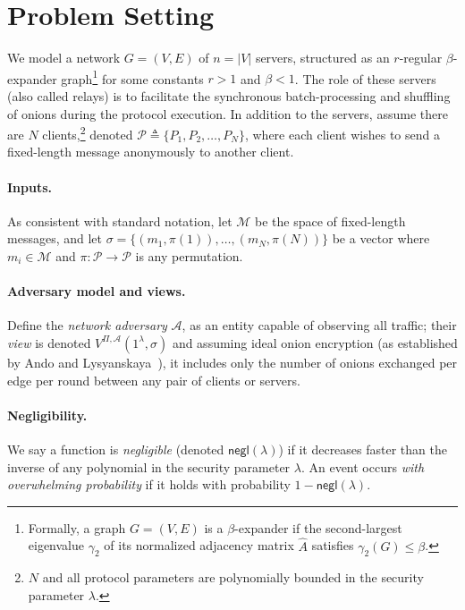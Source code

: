 \section{Problem Setting}

We model a network $G = (V, E)$ of  $n = |V|$ servers, structured as an $r$-regular $\beta$-expander graph\footnote{Formally, a graph $G = (V, E)$ is a $\beta$-expander if the second-largest eigenvalue $\gamma_2$ of its normalized adjacency matrix $\hat{A}$ satisfies $\gamma_2(G) \leq \beta$.} for some constants $r > 1$ and $\beta < 1$. The role of these servers (also called relays) is to facilitate the synchronous batch-processing and shuffling of onions during the protocol execution. In addition to the servers, assume there are $N$ clients,\footnote{$N$ and all protocol parameters are polynomially bounded in the security parameter $\lambda$.} denoted $\mathcal{P} \triangleq \{P_1, P_2, \dots, P_N\}$, where each client wishes to send a fixed-length message anonymously to another client. 

\paragraph{Inputs.} As consistent with standard notation, let $\mathcal{M}$ be the space of fixed-length messages, and let $\sigma = \{(m_1, \pi(1)), \dots, (m_N, \pi(N))\}$ be a vector where $m_i \in \mathcal{M}$ and $\pi: \mathcal{P} \to \mathcal{P}$ is any permutation. 

\paragraph{Adversary model and views.} Define the \textit{network adversary} $\mathcal{A}$, as an entity capable of observing all traffic; their \textit{view} is denoted $V^{\Pi,\mathcal{A}}(1^\lambda, \sigma)$ and assuming ideal onion encryption (as established by Ando and Lysyanskaya~\cite{TCC:AndLys21}), it includes only the number of onions exchanged per edge per round between any pair of clients or servers. 

\paragraph{Negligibility.} We say a function is \textit{negligible} (denoted $\mathsf{negl}(\lambda)$) if it decreases faster than the inverse of any polynomial in the security parameter $\lambda$. An event occurs \textit{with overwhelming probability} if it holds with probability $1 - \mathsf{negl}(\lambda)$.   

